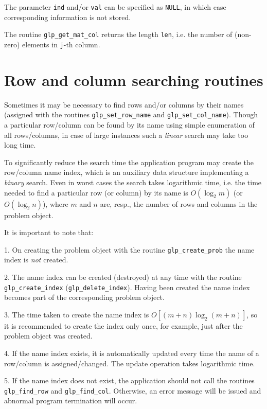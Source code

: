The parameter \verb|ind| and/or \verb|val| can be specified as
\verb|NULL|, in which case corresponding information is not stored.

\returns

The routine \verb|glp_get_mat_col| returns the length \verb|len|, i.e.
the number of (non-zero) elements in \verb|j|-th column.


\newpage

\section{Row and column searching routines}

Sometimes it may be necessary to find rows and/or columns by their
names (assigned with the routines \verb|glp_set_row_name| and
\verb|glp_set_col_name|). Though a particular row/column can be found
by its name using simple enumeration of all rows/columns, in case of
large instances such a {\it linear} search may take too long time.

To significantly reduce the search time the application program may
create the row/column name index, which is an auxiliary data structure
implementing a {\it binary} search. Even in worst cases the search
takes logarithmic time, i.e. the time needed to find a particular row
(or column) by its name is $O(\log_2m)$ (or $O(\log_2n)$), where $m$
and $n$ are, resp., the number of rows and columns in the problem
object.

It is important to note that:

1. On creating the problem object with the routine
\verb|glp_create_prob| the name index is {\it not} created.

2. The name index can be created (destroyed) at any time with the
routine \verb|glp_create_index| (\verb|glp_delete_index|). Having been
created the name index becomes part of the corresponding problem
object.

3. The time taken to create the name index is $O[(m+n)\log_2(m+n)]$,
so it is recommended to create the index only once, for example, just
after the problem object was created.

4. If the name index exists, it is automatically updated every time
the name of a row/column is assigned/changed. The update operation
takes logarithmic time.

5. If the name index does not exist, the application should not call
the routines \verb|glp_find_row| and \verb|glp_find_col|. Otherwise,
an error message will be issued and abnormal program termination will
occur.

